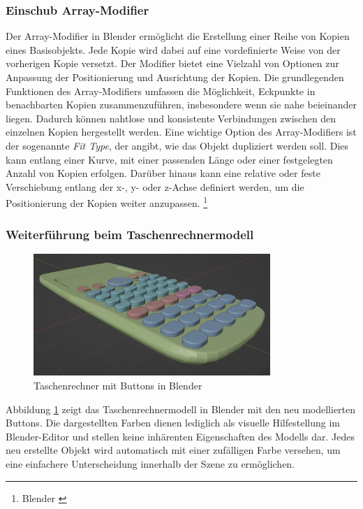\subsubsection*{Einschub Array-Modifier}
Der Array-Modifier in Blender ermöglicht die Erstellung einer Reihe von Kopien eines Basisobjekts. Jede Kopie wird dabei auf eine vordefinierte Weise von der vorherigen Kopie versetzt. Der Modifier bietet eine Vielzahl von Optionen zur Anpassung der Positionierung und Ausrichtung der Kopien.
Die grundlegenden Funktionen des Array-Modifiers umfassen die Möglichkeit, Eckpunkte in benachbarten Kopien zusammenzuführen, insbesondere wenn sie nahe beieinander liegen. Dadurch können nahtlose und konsistente Verbindungen zwischen den einzelnen Kopien hergestellt werden.
Eine wichtige Option des Array-Modifiers ist der sogenannte \textit{Fit Type}, der angibt, wie das Objekt dupliziert werden soll. Dies kann entlang einer Kurve, mit einer passenden Länge oder einer festgelegten Anzahl von Kopien erfolgen. Darüber hinaus kann eine relative oder feste Verschiebung entlang der x-, y- oder z-Achse definiert werden, um die Positionierung der Kopien weiter anzupassen. \footnote{Blender \cite{Array Modifier}}

\subsubsection*{Weiterführung beim Taschenrechnermodell}
\begin{figure}[H]
    \centering
    \includegraphics[width=0.8\textwidth]{images/taschenrechnermitbuttons.png}
    \caption{Taschenrechner mit Buttons in Blender}
    \label{fig:tcbuttons}
\end{figure}

Abbildung \ref{fig:tcbuttons} zeigt das Taschenrechnermodell in Blender mit den neu modellierten Buttons. Die dargestellten Farben dienen lediglich als visuelle Hilfestellung im Blender-Editor und stellen keine inhärenten Eigenschaften des Modells dar. Jedes neu erstellte Objekt wird automatisch mit einer zufälligen Farbe versehen, um eine einfachere Unterscheidung innerhalb der Szene zu ermöglichen.

